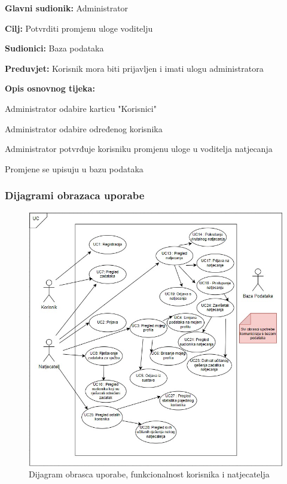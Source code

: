 					\noindent {}
					\begin{packed_item}
						
						\item \textbf{Glavni sudionik: }Administrator
						\item  \textbf{Cilj:} Potvrditi promjenu uloge voditelju
						\item  \textbf{Sudionici:} Baza podataka
						\item  \textbf{Preduvjet:} Korisnik mora biti prijavljen i imati ulogu administratora
						\item  \textbf{Opis osnovnog tijeka:}
						
						\item[] \begin{packed_enum}
							
							\item Administrator odabire karticu "Korisnici"
							\item Administrator odabire određenog korisnika
							\item Administrator potvrđuje korisniku promjenu uloge u voditelja natjecanja
							\item Promjene se upisuju u bazu podataka
						\end{packed_enum}
					\end{packed_item}
					
				\subsubsection{Dijagrami obrazaca uporabe}
							
				\begin{figure}[H]
					\includegraphics[width=\textwidth]{slike/DijagramObrascaUporabe1.jpeg}
					\caption{Dijagram obrasca uporabe, funkcionalnost korisnika i natjecatelja}
					\label{fig:dijaguporab1}
				\end{figure}
			\eject	

